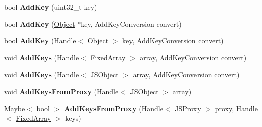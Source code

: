 \begin{DoxyCompactItemize}
\item 
bool {\bfseries Add\+Key} (uint32\+\_\+t key)\hypertarget{classv8_1_1internal_1_1_b_a_s_e___e_m_b_e_d_d_e_d_afe140fae63654038751708244e4fd869}{}\label{classv8_1_1internal_1_1_b_a_s_e___e_m_b_e_d_d_e_d_afe140fae63654038751708244e4fd869}

\item 
bool {\bfseries Add\+Key} (\hyperlink{classv8_1_1internal_1_1_object}{Object} $\ast$key, Add\+Key\+Conversion convert)\hypertarget{classv8_1_1internal_1_1_b_a_s_e___e_m_b_e_d_d_e_d_a53c9436d3d93d0f72bc77b7aeacc1b59}{}\label{classv8_1_1internal_1_1_b_a_s_e___e_m_b_e_d_d_e_d_a53c9436d3d93d0f72bc77b7aeacc1b59}

\item 
bool {\bfseries Add\+Key} (\hyperlink{classv8_1_1internal_1_1_handle}{Handle}$<$ \hyperlink{classv8_1_1internal_1_1_object}{Object} $>$ key, Add\+Key\+Conversion convert)\hypertarget{classv8_1_1internal_1_1_b_a_s_e___e_m_b_e_d_d_e_d_aa5bbefa1fc7a62d6822f3012080c987c}{}\label{classv8_1_1internal_1_1_b_a_s_e___e_m_b_e_d_d_e_d_aa5bbefa1fc7a62d6822f3012080c987c}

\item 
void {\bfseries Add\+Keys} (\hyperlink{classv8_1_1internal_1_1_handle}{Handle}$<$ \hyperlink{classv8_1_1internal_1_1_fixed_array}{Fixed\+Array} $>$ array, Add\+Key\+Conversion convert)\hypertarget{classv8_1_1internal_1_1_b_a_s_e___e_m_b_e_d_d_e_d_ac6cb2a6226407c133b71bb2d5fdbee71}{}\label{classv8_1_1internal_1_1_b_a_s_e___e_m_b_e_d_d_e_d_ac6cb2a6226407c133b71bb2d5fdbee71}

\item 
void {\bfseries Add\+Keys} (\hyperlink{classv8_1_1internal_1_1_handle}{Handle}$<$ \hyperlink{classv8_1_1internal_1_1_j_s_object}{J\+S\+Object} $>$ array, Add\+Key\+Conversion convert)\hypertarget{classv8_1_1internal_1_1_b_a_s_e___e_m_b_e_d_d_e_d_aae9917f41d1e9217b48ec919e8a062b4}{}\label{classv8_1_1internal_1_1_b_a_s_e___e_m_b_e_d_d_e_d_aae9917f41d1e9217b48ec919e8a062b4}

\item 
void {\bfseries Add\+Keys\+From\+Proxy} (\hyperlink{classv8_1_1internal_1_1_handle}{Handle}$<$ \hyperlink{classv8_1_1internal_1_1_j_s_object}{J\+S\+Object} $>$ array)\hypertarget{classv8_1_1internal_1_1_b_a_s_e___e_m_b_e_d_d_e_d_ad9e875a7b5d8aa33914783ba612e124f}{}\label{classv8_1_1internal_1_1_b_a_s_e___e_m_b_e_d_d_e_d_ad9e875a7b5d8aa33914783ba612e124f}

\item 
\hyperlink{classv8_1_1_maybe}{Maybe}$<$ bool $>$ {\bfseries Add\+Keys\+From\+Proxy} (\hyperlink{classv8_1_1internal_1_1_handle}{Handle}$<$ \hyperlink{classv8_1_1internal_1_1_j_s_proxy}{J\+S\+Proxy} $>$ proxy, \hyperlink{classv8_1_1internal_1_1_handle}{Handle}$<$ \hyperlink{classv8_1_1internal_1_1_fixed_array}{Fixed\+Array} $>$ keys)\hypertarget{classv8_1_1internal_1_1_b_a_s_e___e_m_b_e_d_d_e_d_add7cb91152d20729ca66dbe9d22745a0}{}\label{classv8_1_1internal_1_1_b_a_s_e___e_m_b_e_d_d_e_d_add7cb91152d20729ca66dbe9d22745a0}


\end{DoxyCompactItemize}
